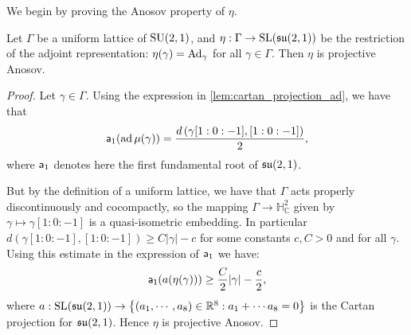 \documentclass{report}
\begin{document}
We begin by proving the Anosov property of $\eta$.
\begin{proposition}\label{prop:counterexample_anosov}
    Let $\Gamma$ be a uniform lattice of $\operatorname{{\mathrm{SU}}}(2,1)$, and $\eta: \Gamma \to \operatorname{{\mathrm{SL}}}(\mathfrak{su}(2,1))$ be the restriction of the adjoint representation: $\eta(\gamma) = \operatorname{Ad}_{\gamma}$ for all $\gamma \in \Gamma$.
    Then $\eta$ is projective Anosov.
\end{proposition}
\begin{proof}
Let $\gamma \in \Gamma$.
Using the expression in \cref{lem:cartan_projection_ad}, we have that
\[
{\sf a}_1(\operatorname{ad} \mu(\gamma)) = \frac{d\left(\gamma [1:0:-1], [1:0:-1]\right)}{2},
\]
where ${\sf a}_1$ denotes here the first fundamental root of $\operatorname{{\mathfrak{su}}}(2,1)$.

But by the definition of a uniform lattice, we have that $\Gamma$ acts properly discontinuously and cocompactly, so the mapping $\Gamma \to \mathbb H^2_{\mathbb C}$ given by $\gamma \mapsto \gamma [1:0:-1]$ is a quasi-isometric embedding.
In particular $d\left(\gamma [1:0:-1], [1:0:-1]\right) \geq C |\gamma| - c$ for some constants $c,C > 0$ and for all $\gamma$.
Using this estimate in the expression of ${\sf a}_1$ we have:
\[
{\sf a_1}(a(\eta(\gamma))) \geq \frac{C}{2}|\gamma| - \frac{c}{2},
\]
where $a:\operatorname{{\mathrm{SL}}}(\operatorname{{\mathfrak{su}}}(2,1)) \to \left\{ (a_1, \cdots, a_8) \in \mathbb R^8 : a_1 + \cdots a_8 = 0 \right\}$ is the Cartan projection for $\operatorname{{\mathfrak{su}}}(2,1)$.
Hence $\eta$ is projective Anosov.
\end{proof}
\end{document}
